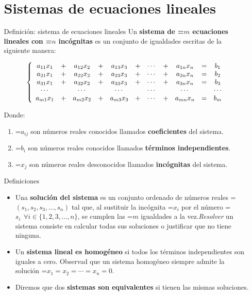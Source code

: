 \documentclass[11pt,a4paper]{article}
\newcommand{\fmm}[1]{\setbox0=\hbox{$#1$}\ifdim\wd0>\linewidth\fmdisp{#1}\else\mbox{\box0}\fi}
\newcommand{\fmdisp}[1]{\[\setbox2=\hbox{$\displaystyle #1$}\ifdim\wd2>\linewidth\resizebox{\linewidth}{!}{\box2}\else\box2\fi\]}
\begin{document}
\section{Sistemas de ecuaciones lineales}\hypertarget{sec1}{}

\begin{fmdef}{Definición: sistema de ecuaciones lineales}
Un \textbf{sistema de \fmm{m} ecuaciones lineales con \fmm{n} incógnitas} es un conjunto de igualdades escritas de la siguiente manera:

\fmdisp{\left\{\begin{array}{ccccccccccc} a_{11}x_1 &+& a_{12}x_2 &+& a_{13}x_3 &+& \cdots &+& a_{1n}x_n &=& b_1\\ a_{21}x_1 &+& a_{22}x_2 &+& a_{23}x_3 &+& \cdots &+& a_{2n}x_n &=& b_2\\ a_{31}x_1 &+& a_{32}x_2 &+& a_{33}x_3 &+& \cdots &+& a_{3n}x_n &=& b_3\\ \cdots && \cdots && \cdots && \cdots && \cdots && \cdots\\ a_{m1}x_1 &+& a_{m2}x_2 &+& a_{m3}x_3 &+& \cdots &+& a_{mn}x_n &=& b_m\end{array}\right.}

Donde:

\begin{enumerate}
\item \fmm{a_{ij}} son números reales conocidos llamados \textbf{coeficientes} del sistema.
\item \fmm{b_i} son números reales conocidos llamados \textbf{términos independientes}.
\item \fmm{x_j} son números reales desconocidos llamados \textbf{incógnitas} del sistema.
\end{enumerate}
\end{fmdef}

\begin{fmdef}{Definiciones}
\begin{itemize}
\item Una \textbf{solución del sistema} es un conjunto ordenado de números reales \fmm{(s_1,s_2,s_3,\dots,s_n)} tal que, al sustituir la incógnita \fmm{x_i} por el número \fmm{s_i\ \ \forall i\in\{1,2,3,\dots,n\}}, se cumplen las \fmm{m} igualdades a la vez.\newline \emph{Resolver} un sistema consiste en calcular todas sus soluciones o justificar que no tiene ninguna.
\item Un \textbf{sistema lineal es homogéneo} si todos los términos independientes son iguales a cero. Observad que un sistema homogéneo siempre admite la solución \fmm{x_1=x_2=\cdots=x_n=0}.
\item Diremos que dos \textbf{sistemas son equivalentes} si tienen las mismas soluciones.
\end{itemize}
\end{fmdef}
\end{document}
